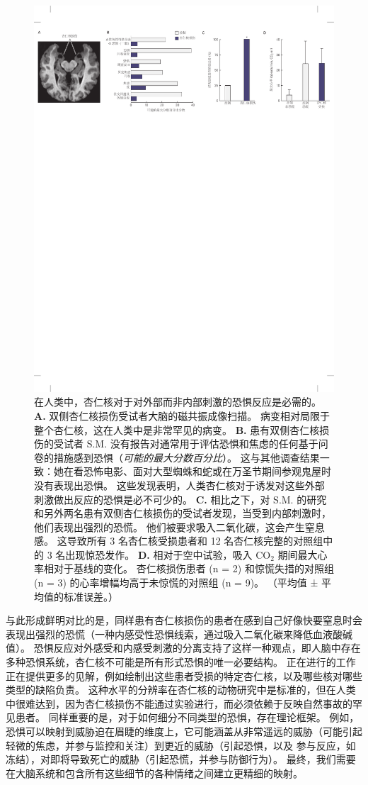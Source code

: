 \begin{figure}[htbp]
	\centering
	\includegraphics[width=0.7\linewidth]{chap42/fig_42_6}
	\caption{在人类中，杏仁核对于对外部而非内部刺激的恐惧反应是必需的。
		\textbf{A.} 双侧杏仁核损伤受试者大脑的磁共振成像扫描。
		病变相对局限于整个杏仁核，这在人类中是非常罕见的病变。
		\textbf{B.} 患有双侧杏仁核损伤的受试者 S.M. 没有报告对通常用于评估恐惧和焦虑的任何基于问卷的措施感到恐惧（\textit{可能的最大分数百分比}）。
		这与其他调查结果一致：她在看恐怖电影、面对大型蜘蛛和蛇或在万圣节期间参观鬼屋时没有表现出恐惧。
		这些发现表明，人类杏仁核对于诱发对这些外部刺激做出反应的恐惧是必不可少的。
		\textbf{C.} 相比之下，对 S.M. 的研究和另外两名患有双侧杏仁核损伤的受试者发现，当受到内部刺激时，他们表现出强烈的恐慌。
		他们被要求吸入二氧化碳，这会产生窒息感。
		这导致所有 3 名杏仁核受损患者和 12 名杏仁核完整的对照组中的 3 名出现惊恐发作。
		\textbf{D.} 相对于空中试验，吸入 CO$_2$ 期间最大心率相对于基线的变化。
		杏仁核损伤患者 (n = 2) 和惊慌失措的对照组 (n = 3) 的心率增幅均高于未惊慌的对照组 (n = 9)。
		（平均值 ± 平均值的标准误差。）\cite{feinstein2011human} }
	\label{fig:42_6}
\end{figure}


与此形成鲜明对比的是，同样患有杏仁核损伤的患者在感到自己好像快要窒息时会表现出强烈的恐慌（一种内感受性恐惧线索，通过吸入二氧化碳来降低血液酸碱值）。
恐惧反应对外感受和内感受刺激的分离支持了这样一种观点，即人脑中存在多种恐惧系统，杏仁核不可能是所有形式恐惧的唯一必要结构。
正在进行的工作正在提供更多的见解，例如绘制出这些患者受损的特定杏仁核，以及哪些核对哪些类型的缺陷负责。
这种水平的分辨率在杏仁核的动物研究中是标准的，但在人类中很难达到，因为杏仁核损伤不能通过实验进行，而必须依赖于反映自然事故的罕见患者。
同样重要的是，对于如何细分不同类型的恐惧，存在理论框架。
例如，恐惧可以映射到威胁迫在眉睫的维度上，它可能涵盖从非常遥远的威胁（可能引起轻微的焦虑，并参与监控和关注）到更近的威胁（引起恐惧，以及 参与反应，如冻结），对即将导致死亡的威胁（引起恐慌，并参与防御行为）。
最终，我们需要在大脑系统和包含所有这些细节的各种情绪之间建立更精细的映射。


